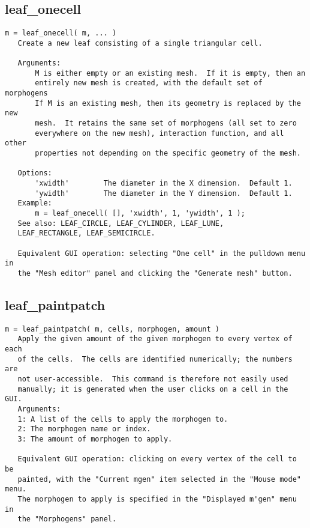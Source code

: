 \subsection{leaf\_onecell}\label{section-leaf-onecell}

\begin{verbatim}
m = leaf_onecell( m, ... )
   Create a new leaf consisting of a single triangular cell.

   Arguments:
       M is either empty or an existing mesh.  If it is empty, then an
       entirely new mesh is created, with the default set of morphogens
       If M is an existing mesh, then its geometry is replaced by the new
       mesh.  It retains the same set of morphogens (all set to zero
       everywhere on the new mesh), interaction function, and all other
       properties not depending on the specific geometry of the mesh.

   Options:
       'xwidth'        The diameter in the X dimension.  Default 1.
       'ywidth'        The diameter in the Y dimension.  Default 1.
   Example:
       m = leaf_onecell( [], 'xwidth', 1, 'ywidth', 1 );
   See also: LEAF_CIRCLE, LEAF_CYLINDER, LEAF_LUNE,
   LEAF_RECTANGLE, LEAF_SEMICIRCLE.

   Equivalent GUI operation: selecting "One cell" in the pulldown menu in
   the "Mesh editor" panel and clicking the "Generate mesh" button.
\end{verbatim}

\subsection{leaf\_paintpatch}\label{section-leaf-paintpatch}

\begin{verbatim}
m = leaf_paintpatch( m, cells, morphogen, amount )
   Apply the given amount of the given morphogen to every vertex of each
   of the cells.  The cells are identified numerically; the numbers are
   not user-accessible.  This command is therefore not easily used
   manually; it is generated when the user clicks on a cell in the GUI.
   Arguments:
   1: A list of the cells to apply the morphogen to.
   2: The morphogen name or index.
   3: The amount of morphogen to apply.

   Equivalent GUI operation: clicking on every vertex of the cell to be
   painted, with the "Current mgen" item selected in the "Mouse mode" menu.
   The morphogen to apply is specified in the "Displayed m'gen" menu in
   the "Morphogens" panel.
\end{verbatim}


